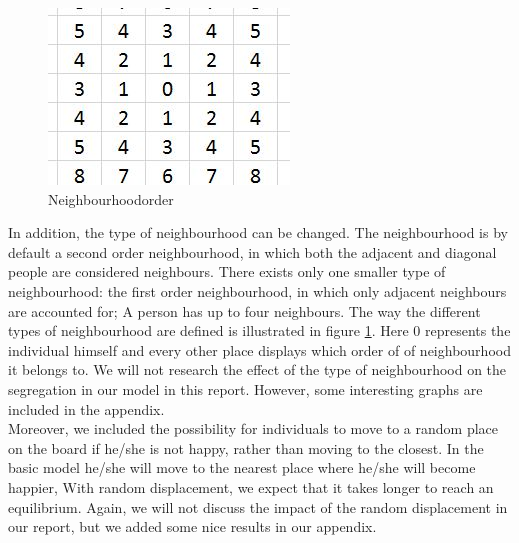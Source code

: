 
\begin{figure}
\vspace{-20pt}
\centering
\includegraphics[scale=0.5]{buurtorde.jpg}
\caption{Neighbourhoodorder}
\vspace{-15pt}
\label{fig:neighbourhood}
\end{figure}

In addition,  the type of neighbourhood can be changed.
The neighbourhood is  by default a second order neighbourhood, in which both the adjacent and diagonal people are considered neighbours.
There exists only one smaller type of neighbourhood: the first order neighbourhood, in which only adjacent neighbours are accounted for; A person has up to four neighbours.
The way the different types of neighbourhood are defined is illustrated in figure \ref{fig:neighbourhood}.
Here $0$ represents the individual himself and every other place displays which order of  of neighbourhood it belongs to.
We will not research the effect of the type of neighbourhood on the segregation in our model in this report.
However, some interesting graphs are included in the appendix.\\

Moreover, we included the possibility for individuals to move to a random place on the board if he/she is not happy, rather than moving to the closest.
In the basic model he/she will move to the nearest place where he/she will become happier, With random displacement, we expect that it takes longer to reach an equilibrium.
Again, we will not discuss the impact of the random displacement in our report, but we added some nice results in our appendix.\\

